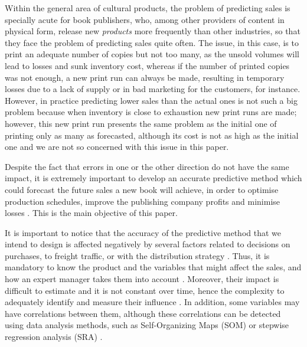 \documentclass[a4paper,10pt,twocolumn,preprint,3p]{elsarticle}
\begin{document}
Within the general area of cultural products, the problem of
predicting sales is specially acute for book publishers, who, among other
providers of content in physical form, release new {\em products} more frequently than
other industries, so that they face the problem of predicting sales quite often. The issue, in this case, is to print an adequate number of copies but not too many, as the unsold volumes will lead to losses and sunk inventory cost, 
whereas if the number of printed copies was not enough, a new print
run can always be made, resulting in temporary losses due to a lack of supply
or in bad marketing for the customers, for instance. However, in
practice predicting lower sales than the actual ones is not such a big
problem because when inventory is close to exhaustion new print runs
are made; however, this new print run presents the same problem as the
initial one of printing only as many as forecasted, although its cost
is not as high as the initial one and we are not so concerned with
this issue in this paper.

Despite the fact that errors in one or the other direction do not have
the same impact, it is extremely important to develop an accurate
predictive method 
which could forecast the future sales a new book will achieve, in
order to optimise production schedules, improve the publishing company
profits and minimise losses \cite{Zhao2001}. This is the main objective of this paper.

It is important to notice that the accuracy of the predictive method
that we intend to design is affected negatively by several factors
related to decisions on purchases, to freight traffic, or with the
distribution strategy \cite{Little1998}. 
Thus, it is mandatory to know the product and the variables that
might affect the sales, and how an expert manager takes them into 
account \cite{Armstrong2001,SThomassey2014}. 
Moreover, their impact is difficult to estimate and it is not constant over time, hence the complexity to adequately identify and measure their influence \cite{DeToni2000}.
In addition, some variables may have correlations between them, although these correlations can be detected using data analysis methods, 
such as Self-Organizing Maps (SOM) \cite{kohonen1998} or stepwise regression analysis (SRA) \cite{Chang2009}. 
\end{document}
